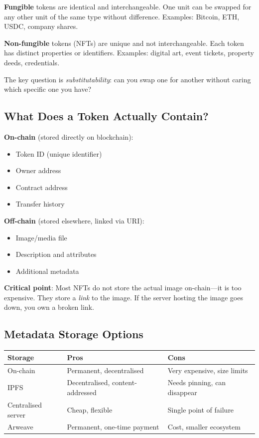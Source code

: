\documentclass[11pt,a4paper]{article}
\newcommand{\keyword}[1]{\textbf{\textcolor{AccentOrange}{#1}}}
\begin{document}
\keyword{Fungible} tokens are identical and interchangeable. One unit can be swapped for any other unit of the same type without difference. Examples: Bitcoin, ETH, USDC, company shares.

\keyword{Non-fungible} tokens (NFTs) are unique and not interchangeable. Each token has distinct properties or identifiers. Examples: digital art, event tickets, property deeds, credentials.

The key question is \textit{substitutability}: can you swap one for another without caring which specific one you have?

\subsection{What Does a Token Actually Contain?}

\textbf{On-chain} (stored directly on blockchain):
\begin{itemize}
    \item Token ID (unique identifier)
    \item Owner address
    \item Contract address
    \item Transfer history
\end{itemize}

\textbf{Off-chain} (stored elsewhere, linked via URI):
\begin{itemize}
    \item Image/media file
    \item Description and attributes
    \item Additional metadata
\end{itemize}

\keyword{Critical point}: Most NFTs do not store the actual image on-chain---it is too expensive. They store a \textit{link} to the image. If the server hosting the image goes down, you own a broken link.

\subsection{Metadata Storage Options}

\begin{center}
\begin{tabular}{lll}
\toprule
\textbf{Storage} & \textbf{Pros} & \textbf{Cons} \\
\midrule
On-chain & Permanent, decentralised & Very expensive, size limits \\
IPFS & Decentralised, content-addressed & Needs pinning, can disappear \\
Centralised server & Cheap, flexible & Single point of failure \\
Arweave & Permanent, one-time payment & Cost, smaller ecosystem \\
\bottomrule
\end{tabular}
\end{center}
\end{document}

